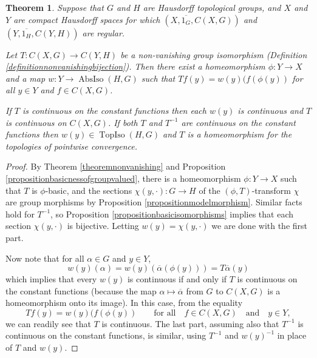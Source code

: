 \documentclass[letter,11pt]{amsart}
\theoremstyle{plain}		\newtheorem{theorem}[generalnumbering]{Theorem}
\theoremstyle{plain}		\newtheorem{corollary}[generalnumbering]{Corollary}
\theoremstyle{definition}		\newtheorem{definition}[generalnumbering]{Definition}
\theoremstyle{definition}		\newtheorem{example}[generalnumbering]{Example}
\theoremstyle{plain}		\newtheorem{proposition}[generalnumbering]{Proposition}
\theoremstyle{plain}		\newtheorem{lemma}[generalnumbering]{Lemma}
\theoremstyle{plain}    \newtheorem{plainstyle}[generalnumbering]{\namefordifferentenvironment}
\theoremstyle{plain}    \newtheorem*{plainstyle*}{\namefordifferentenvironment}
\theoremstyle{definition}    \newtheorem{definitionstyle}[generalnumbering]{\namefordifferentenvironment}
\theoremstyle{definition}    \newtheorem*{definitionstyle*}{\namefordifferentenvironment}
\begin{document}
\begin{theorem}
	Suppose that $G$ and $H$ are Hausdorff topological groups, and $X$ and $Y$ are compact Hausdorff spaces for which $(X,\overline{1_G},C(X,G))$ and $(Y,\overline{1_H},C(Y,H))$ are regular.
	
	Let $T\colon C(X,G)\to C(Y,H)$ be a non-vanishing group isomorphism (Definition \ref{definitionnonvanishingbijection}). Then there exist a homeomorphism $\phi\colon Y\to X$ and a map $w\colon Y\to\operatorname{AbsIso}(H,G)$ such that $Tf(y)=w(y)(f(\phi(y))$ for all $y\in Y$ and $f\in C(X,G)$.
	
	If $T$ is continuous on the constant functions then each $w(y)$ is continuous and $T$ is continuous on $C(X,G)$. If both $T$ and $T^{-1}$ are continuous on the constant functions then $w(y)\in\operatorname{TopIso}(H,G)$ and $T$ is a homeomorphism for the topologies of pointwise convergence.
\end{theorem}
\begin{proof}
	By Theorem \ref{theoremnonvanishing} and Proposition \ref{propositionbasicnessofgroupvalued}, there is a homeomorphism $\phi\colon Y\to X$ such that $T$ is $\phi$-basic, and the sections $\chi(y,\cdot)\colon G\to H$ of the $(\phi,T)$-transform $\chi$ are group morphisms by Proposition \ref{propositionmodelmorphism}. Similar facts hold for $T^{-1}$, so Proposition \ref{propositionbasicisomorphisms} implies that each section $\chi(y,\cdot)$ is bijective. Letting $w(y)=\chi(y,\cdot)$ we are done with the first part.
	
	Now note that for all $\alpha\in G$ and $y\in Y$,
	\[w(y)(\alpha)=w(y)(\overline{\alpha}(\phi(y)))=T\overline{\alpha}(y)\]
	which implies that every $w(y)$ is continuous if and only if $T$ is continuous on the constant functions (because the map $\alpha\mapsto\overline{\alpha}$ from $G$ to $C(X,G)$ is a homeomorphism onto its image). In this case, from the equality
	\[Tf(y)=w(y)(f(\phi(y))\qquad\text{for all}\quad f\in C(X,G)\quad\text{and}\quad y\in Y,\]
	we can readily see that $T$ is continuous. The last part, assuming also that $T^{-1}$ is continuous on the constant functions, is similar, using $T^{-1}$ and $w(y)^{-1}$ in place of $T$ and $w(y)$.
\end{proof}

\end{document}
